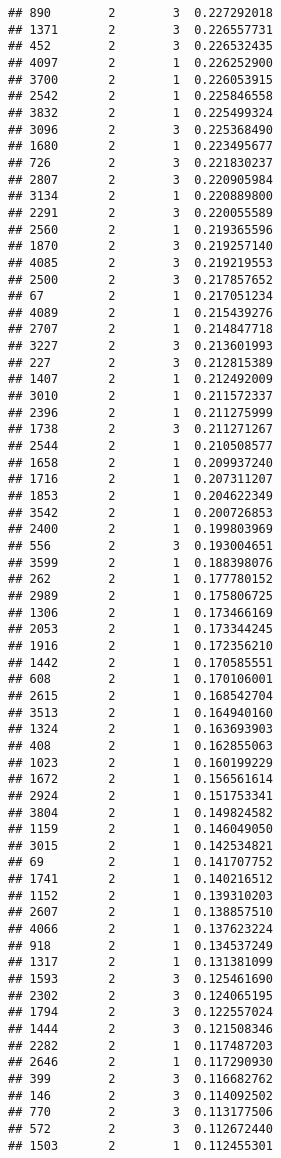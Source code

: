 \documentclass[
]{article}
\begin{document}
\begin{verbatim}
## 890        2        3  0.227292018
## 1371       2        3  0.226557731
## 452        2        3  0.226532435
## 4097       2        1  0.226252900
## 3700       2        1  0.226053915
## 2542       2        1  0.225846558
## 3832       2        1  0.225499324
## 3096       2        3  0.225368490
## 1680       2        1  0.223495677
## 726        2        3  0.221830237
## 2807       2        3  0.220905984
## 3134       2        1  0.220889800
## 2291       2        3  0.220055589
## 2560       2        1  0.219365596
## 1870       2        3  0.219257140
## 4085       2        3  0.219219553
## 2500       2        3  0.217857652
## 67         2        1  0.217051234
## 4089       2        1  0.215439276
## 2707       2        1  0.214847718
## 3227       2        3  0.213601993
## 227        2        3  0.212815389
## 1407       2        1  0.212492009
## 3010       2        1  0.211572337
## 2396       2        1  0.211275999
## 1738       2        3  0.211271267
## 2544       2        1  0.210508577
## 1658       2        1  0.209937240
## 1716       2        1  0.207311207
## 1853       2        1  0.204622349
## 3542       2        1  0.200726853
## 2400       2        1  0.199803969
## 556        2        3  0.193004651
## 3599       2        1  0.188398076
## 262        2        1  0.177780152
## 2989       2        1  0.175806725
## 1306       2        1  0.173466169
## 2053       2        1  0.173344245
## 1916       2        1  0.172356210
## 1442       2        1  0.170585551
## 608        2        1  0.170106001
## 2615       2        1  0.168542704
## 3513       2        1  0.164940160
## 1324       2        1  0.163693903
## 408        2        1  0.162855063
## 1023       2        1  0.160199229
## 1672       2        1  0.156561614
## 2924       2        1  0.151753341
## 3804       2        1  0.149824582
## 1159       2        1  0.146049050
## 3015       2        1  0.142534821
## 69         2        1  0.141707752
## 1741       2        1  0.140216512
## 1152       2        1  0.139310203
## 2607       2        1  0.138857510
## 4066       2        1  0.137623224
## 918        2        1  0.134537249
## 1317       2        1  0.131381099
## 1593       2        3  0.125461690
## 2302       2        3  0.124065195
## 1794       2        3  0.122557024
## 1444       2        3  0.121508346
## 2282       2        1  0.117487203
## 2646       2        1  0.117290930
## 399        2        3  0.116682762
## 146        2        3  0.114092502
## 770        2        3  0.113177506
## 572        2        3  0.112672440
## 1503       2        1  0.112455301

\end{verbatim}
\end{document}
